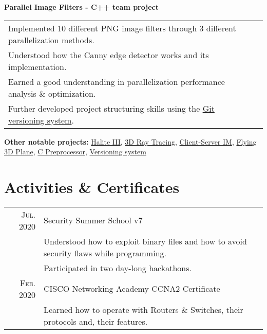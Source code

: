 \documentclass[a4paper,10pt]{article}
\begin{document}
	\begin{flushleft}
		\textbf{Parallel Image Filters - C++ team project}
	\end{flushleft}
	\begin{tabular}{ll}
		\textbullet\enspace\enspace Implemented 10 different PNG image filters through 3 different parallelization methods.\\
		\textbullet\enspace\enspace Understood how the Canny edge detector works and its implementation.\\
		\textbullet\enspace\enspace Earned a good understanding in parallelization performance analysis \& optimization.\\
		\textbullet\enspace\enspace Further developed project structuring skills using the \href{https://github.com/craciunoiuc/parallel-architectures}{Git versioning system}.\\
	\end{tabular}

	\begin{flushleft}
	\textbf{Other notable projects:} 
		\href{https://github.com/craciunoiuc/Halite-III}{Halite III},
		\href{https://github.com/craciunoiuc/computer-graphics-2}{3D Ray Tracing},
		\href{https://github.com/craciunoiuc/network-protocols/tree/master/Client%20-%20Server}{Client-Server IM},
		\href{https://github.com/craciunoiuc/computer-graphics/tree/master/Source/Teme/Flying%203D%20Plane}{Flying 3D Plane},
		\href{https://github.com/craciunoiuc/operating-systems/tree/master/1-multi}{C Preprocessor},
		\href{https://github.com/craciunoiuc/oop-homework/tree/master/Version%20Control%20System}{Versioning system}
	\end{flushleft}

\section{Activities \& Certificates}
	\begin{tabular}{rl}
		\textsc{Jul.} 2020 & Security Summer School v7\\&
			\textbullet\enspace\enspace Understood how to exploit binary files and how to avoid security flaws while programming.\\&
			\textbullet\enspace\enspace Participated in two day-long hackathons.\\
		\textsc{Feb.} 2020 & CISCO Networking Academy CCNA2 Certificate\\&
			\textbullet\enspace\enspace Learned how to operate with Routers \& Switches, their protocols and, their features.\\
	\end{tabular}
\end{document}
